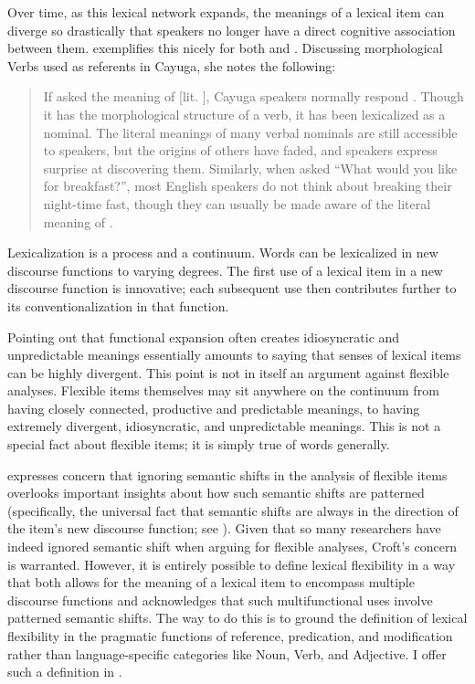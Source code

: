 Over time, as this lexical network expands, the meanings of a lexical item can diverge so drastically that speakers no longer have a direct cognitive association between them. \citeauthor{Mithun2000} exemplifies this nicely for both  and . Discussing morphological Verbs used as referents in Cayuga, she notes the following:

\blockquote[{\cite[413]{Mithun2000}}]{If asked the meaning of  [lit. ], Cayuga speakers normally respond . Though it has the morphological structure of a verb, it has been lexicalized as a nominal. The literal meanings of many verbal nominals are still accessible to speakers, but the origins of others have faded, and speakers express surprise at discovering them. Similarly, when asked \enquote{What would you like for breakfast?}, most English speakers do not think about breaking their night-time fast, though they can usually be made aware of the literal meaning of .}

\noindent Lexicalization is a process and a continuum. Words can be lexicalized in new discourse functions to varying degrees. The first use of a lexical item in a new discourse function is innovative; each subsequent use then contributes further to its conventionalization in that function.

Pointing out that functional expansion often creates idiosyncratic and unpredictable meanings essentially amounts to saying that senses of lexical items can be highly divergent. This point is not in itself an argument against flexible analyses. Flexible items themselves may sit anywhere on the continuum from having closely connected, productive and predictable meanings, to having extremely divergent, idiosyncratic, and unpredictable meanings. This is not a special fact about flexible items; it is simply true of words generally.

\textcite[73]{Croft2001b} expresses concern that ignoring semantic shifts in the analysis of flexible items overlooks important insights about how such semantic shifts are patterned (specifically, the universal fact that semantic shifts are always in the direction of the item's new discourse function; see ). Given that so many researchers have indeed ignored semantic shift when arguing for flexible analyses, Croft's concern is warranted. However, it is entirely possible to define lexical flexibility in a way that both allows for the meaning of a lexical item to encompass multiple discourse functions and acknowledges that such multifunctional uses involve patterned semantic shifts. The way to do this is to ground the definition of lexical flexibility in the pragmatic functions of reference, predication, and modification rather than language-specific categories like Noun, Verb, and Adjective. I offer such a definition in .

